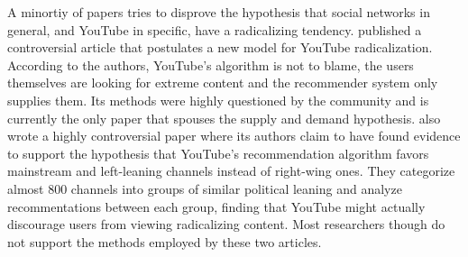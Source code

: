 A minortiy of papers tries to disprove the hypothesis that social networks in
general, and YouTube in specific, have a radicalizing tendency.
\citet{munger_right-wing_2020} published a controversial article that postulates
a new model for YouTube radicalization. According to the authors, YouTube's
algorithm is not to blame, the users themselves are looking for extreme content
and the recommender system only supplies them. Its methods were highly
questioned by the community and is currently the only paper that spouses the
supply and demand hypothesis. \citet{ledwich_algorithmic_2019} also wrote a
highly controversial paper where its authors claim to have found evidence to
support the hypothesis that YouTube's recommendation algorithm favors mainstream
and left-leaning channels instead of right-wing ones. They categorize almost 800
channels into groups of similar political leaning and analyze recommentations
between each group, finding that YouTube might actually discourage users from
viewing radicalizing content. Most researchers though do not support the methods
employed by these two articles.
